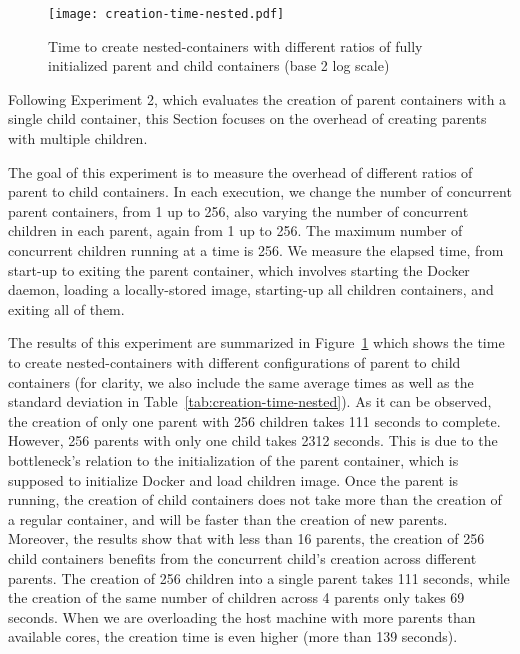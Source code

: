 \documentclass[conference]{IEEEtran}
\begin{document}
\begin{figure}[bth!]
\center
    \texttt{[image: creation-time-nested.pdf]}
    \caption{Time to create nested-containers with different ratios of 
fully initialized parent and child containers (base 2 log scale)}
    \label{fig:creation-time-nested}
\end{figure}

Following Experiment 2, which evaluates the creation of parent containers with
a single child container, this Section focuses on the overhead of creating
parents with multiple children.



The goal of this experiment is to measure the overhead of different ratios of
parent to child containers.  In each execution, we change the number of
concurrent parent containers, from 1 up to 256, also varying the number of
concurrent children in each parent, again from 1 up to 256. The maximum number
of concurrent children running at a time is 256. We measure the elapsed time,
from start-up to exiting the parent container, which involves starting the
Docker daemon, loading a locally-stored image, starting-up all children
containers, and exiting all of them.

The results of this experiment are summarized in
Figure~\ref{fig:creation-time-nested} which shows the time to create  
nested-containers with different configurations of parent to child containers 
(for clarity, we also include the same average times as well as the standard 
deviation in Table~\ref{tab:creation-time-nested}). As it can be observed, the 
creation of only one parent with 256 children takes 111 seconds to complete. 
However, 256 parents with only one child takes 2312 seconds. This is due to the
bottleneck's relation to the initialization of the parent container, which is
supposed to initialize Docker and load children image. Once the parent is 
running, the creation of child containers does not take more than the creation 
of a regular container, and will be faster than the creation of new parents.
Moreover, the results show that with less than 16 parents, the creation of
256 child containers benefits from the concurrent child's creation across
different parents. The creation of 256 children into a single parent takes 111
seconds, while the creation of the same number of children across 4 parents
only takes 69 seconds. When we are overloading the host machine with more 
parents than available cores, the creation time is even higher (more than 139 
seconds).
\end{document}
